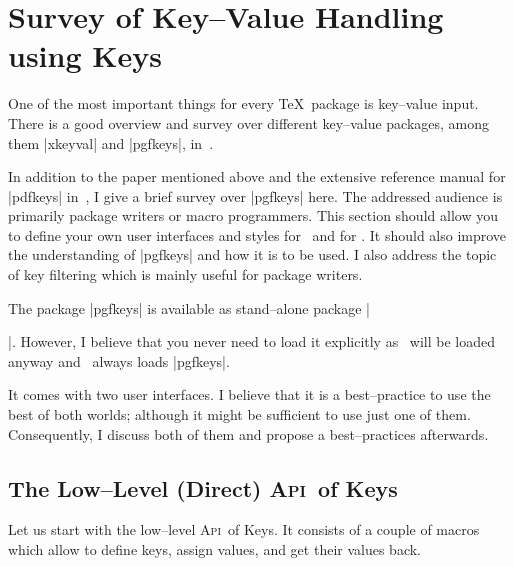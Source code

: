 \documentclass[a4paper]{ltxdoc}
\def\API{\textsc{Api}}%
\begin{document}
\section{Survey of Key--Value Handling using \PGF Keys}

One of the most important things for every \TeX\ package is key--value input. There is a good overview and survey over different key--value packages, among them |xkeyval| and |pgfkeys|, in~\cite{keyvalintro}. 

In addition to the paper mentioned above and the extensive reference manual for |pdfkeys| in~\cite{tikz}, I give a brief survey over |pgfkeys| here. The addressed audience is primarily package writers or macro programmers. This section should allow you to define your own user interfaces and styles for \PGFPlots\ and for \PGF. It should also improve the understanding of |pgfkeys| and how it is to be used. I also address the topic of key filtering which is mainly useful for package writers.

The package |pgfkeys| is available as stand--alone package |\usepackage{pgfkeys}|. However, I believe that you never need to load it explicitly as \PGF\ will be loaded anyway and \PGF\ always loads |pgfkeys|.

It comes with two user interfaces. I believe that it is a best--practice to use the best of both worlds; although it might be sufficient to use just one of them. Consequently, I discuss both of them and propose a best--practices afterwards.

\subsection{The Low--Level (Direct) \API\ of \PGF Keys}
Let us start with the low--level \API\ of \PGF Keys. It consists of a couple of macros which allow to define keys, assign values, and get their values back.
\end{document}
